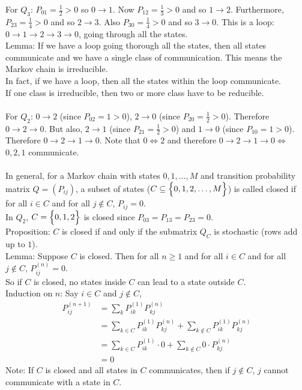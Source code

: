 \documentclass[12pt]{article}
\begin{document}
For $Q_3$: $P_{01} = \frac{1}{2} > 0$ so $0 \to 1$. Now $P_{12} = \frac{1}{3} > 0$ and so $1 \to 2$. Furthermore, $P_{23} = \frac{1}{4} > 0$ and so $2 \to 3$. Also $P_{30} = \frac{1}{4} > 0$ and so $3 \to 0$. This is a loop: $0 \to 1 \to 2 \to 3 \to 0$, going through all the states. \\
Lemma: If we have a loop going thorough all the states, then all states communicate and we have a single class of communication. This means the Markov chain is irreducible. \\
In fact, if we have a loop, then all the states within the loop communicate. \\ If one class is irreducible, then two or more class have to be reducible. \\~\\
For $Q_2$: $0 \to 2$ (since $P_{02} = 1 > 0$), $2 \to 0$ (since $P_{20} = \frac{1}{2} > 0$). Therefore $0 \to 2 \to 0$. But also, $2 \to 1$ (since $P_{21} = \frac{1}{2} > 0$) and $1 \to 0$ (since $P_{10} = 1 > 0$). Therefore $ 0 \to 2 \to 1 \to 0$. Note that $0 \iff 2$ and therefore $0 \to 2 \to 1 \to 0 \iff $ $0, 2, 1$ communicate. \\~\\
In general, for a Markov chain with states $0,1,\dots,M$ and transition probability matrix $Q = (P_{ij})$, a subset of states ($C \subseteq \Big\{ 0,1,2,\dots,M \Big\}$) is called closed if for all $i \in C$ and for all $j \notin C$, $P_{ij} = 0$. \\
In $Q_2$, $C = \Big\{ 0,1,2 \Big\}$ is closed since $P_{03} = P_{13} = P_{23} = 0$. \\
Proposition: $C$ is closed if and only if the submatrix $Q_C$ is stochastic (rows add up to $1$). \\
Lemma: Suppose $C$ is closed. Then for all $n \geq 1$ and for all $i \in C$ and for all $j \notin C$, $P_{ij}^{(n)} = 0$. \\
So if $C$ is closed, no states inside $C$ can lead to a state outside $C$. 
\\ 
Induction on $n$: Say $i \in C$ and $j \notin C$, $$ \begin{aligned} 
P_{ij}^{(n+1)} &= \sum_k P_{ik}^{(1)}P_{kj}^{(n)} \\ &= \sum_{k \in C} P_{ik}^{(1)}P_{kj}^{(n)} + \sum_{k \notin C} P_{ik}^{(1)}P_{kj}^{(n)} \\ &= \sum_{k \in C} P_{ik}^{(1)} \cdot 0 + \sum_{k \notin C} 0 \cdot P_{kj}^{(n)} \\ &= 0 \end{aligned} $$ 
Note: If $C$ is closed and all states in $C$ communicates, then if $j \notin C$, $j$ cannot communicate with a state in $C$. \\
\end{document}
